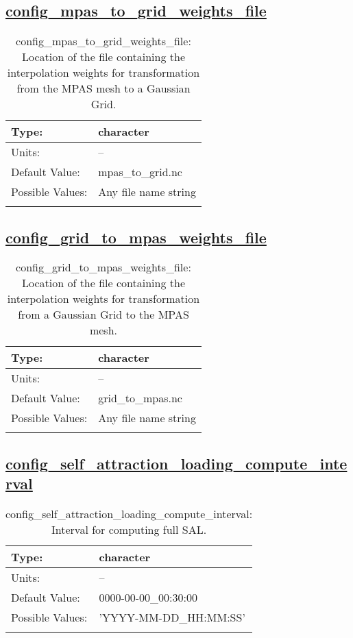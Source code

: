 \subsection[config\_mpas\_to\_grid\_weights\_file]{\hyperref[sec:nm_tab_self_attraction_loading]{config\_mpas\_to\_grid\_weights\_file}}
\label{subsec:nm_sec_config_mpas_to_grid_weights_file}
\begin{center}
\begin{longtable}{| p{2.0in} || p{4.0in} |}
    \hline
    Type: & character \\
    \hline
    Units: & -- \\
    \hline
    Default Value: & mpas\_to\_grid.nc \\
    \hline
    Possible Values: & Any file name string \\
    \hline
    \caption{config\_mpas\_to\_grid\_weights\_file: Location of the file containing the interpolation weights for transformation from the MPAS mesh to a Gaussian Grid.}
\end{longtable}
\end{center}
\subsection[config\_grid\_to\_mpas\_weights\_file]{\hyperref[sec:nm_tab_self_attraction_loading]{config\_grid\_to\_mpas\_weights\_file}}
\label{subsec:nm_sec_config_grid_to_mpas_weights_file}
\begin{center}
\begin{longtable}{| p{2.0in} || p{4.0in} |}
    \hline
    Type: & character \\
    \hline
    Units: & -- \\
    \hline
    Default Value: & grid\_to\_mpas.nc \\
    \hline
    Possible Values: & Any file name string \\
    \hline
    \caption{config\_grid\_to\_mpas\_weights\_file: Location of the file containing the interpolation weights for transformation from a Gaussian Grid to the MPAS mesh.}
\end{longtable}
\end{center}
\subsection[config\_self\_attraction\_loading\_compute\_interval]{\hyperref[sec:nm_tab_self_attraction_loading]{config\_self\_attraction\_loading\_compute\_interval}}
\label{subsec:nm_sec_config_self_attraction_loading_compute_interval}
\begin{center}
\begin{longtable}{| p{2.0in} || p{4.0in} |}
    \hline
    Type: & character \\
    \hline
    Units: & -- \\
    \hline
    Default Value: & 0000-00-00\_00:30:00 \\
    \hline
    Possible Values: & 'YYYY-MM-DD\_HH:MM:SS' \\
    \hline
    \caption{config\_self\_attraction\_loading\_compute\_interval: Interval for computing full SAL.}
\end{longtable}
\end{center}
